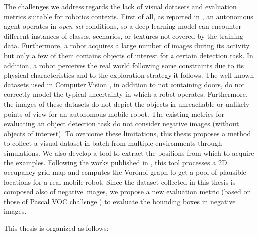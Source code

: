 The challenges we address regards the lack of visual datasets and evaluation metrics suitable for robotics contexts. First of all, as reported in \cite{surveydeeplimits}, an autonomous agent operates in \textit{open-set} conditions, so a deep learning model can encounter different instances of classes, scenarios, or textures not covered by the training data. Furthermore, a robot acquires a large number of images during its activity but only a few of them contains objects of interest for a certain detection task. In addition, a robot perceives the real world following some constraints due to its physical characteristics and to the exploration strategy it follows. The well-known datasets used in Computer Vision \cite{coco, imagenet, pascal}, in addition to not containing doors, do not correctly model the typical uncertainty in which a robot operates. Furthermore, the images of these datasets do not depict the objects in unreachable or unlikely points of view for an autonomous mobile robot. The existing metrics for evaluating an object detection task \cite{pascal, generalizediou, coco} do not consider negative images (without objects of interest). To overcome these limitations, this thesis proposes a method to collect a visual dataset in batch from multiple environments through simulations. We also develop a tool to extract the positions from which to acquire the examples. Following the works published in \cite{repeatabilityslamarxiv, repeatabilityslam}, this tool processes a 2D occupancy grid map and computes the Voronoi graph to get a pool of plausible locations for a real mobile robot. Since the dataset collected in this thesis is composed also of negative images, we propose a new evaluation metric (based on those of Pascal VOC challenge \cite{pascal}) to evaluate the bounding boxes in negative images. 

This thesis is organized as follows:

